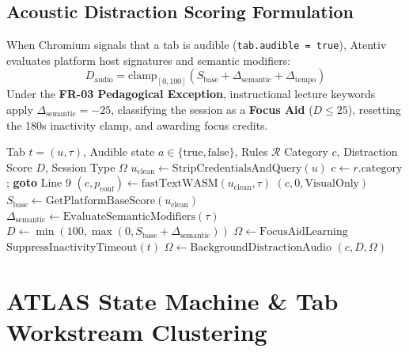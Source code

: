 \documentclass[conference]{IEEEtran}
\begin{document}
\subsection{Acoustic Distraction Scoring Formulation}
When Chromium signals that a tab is audible (\texttt{tab.audible = true}), Atentiv evaluates platform host signatures and semantic modifiers:
\begin{equation}
D_{\text{audio}} = \text{clamp}_{[0, 100]}\left( S_{\text{base}} + \Delta_{\text{semantic}} + \Delta_{\text{tempo}} \right)
\end{equation}
Under the \textbf{FR-03 Pedagogical Exception}, instructional lecture keywords apply $\Delta_{\text{semantic}} = -25$, classifying the session as a \textbf{Focus Aid} ($D \le 25$), resetting the 180s inactivity clamp, and awarding focus credits.

\begin{algorithm}[t]
\caption{Multimodal Contextual Inference Pipeline}
\begin{algorithmic}[1]
\REQUIRE Tab $t = (u, \tau)$, Audible state $a \in \{\text{true}, \text{false}\}$, Rules $\mathcal{R}$
\ENSURE Category $c$, Distraction Score $D$, Session Type $\Omega$
\STATE $u_{\text{clean}} \leftarrow \text{StripCredentialsAndQuery}(u)$
        \STATE $c \leftarrow r.\text{category}$; \textbf{goto} Line 9
    \ENDIF
\ENDFOR
\STATE $(c, p_{\text{conf}}) \leftarrow \text{fastTextWASM}(u_{\text{clean}}, \tau)$
    \RETURN $(c, 0, \text{VisualOnly})$
\ELSE
    \STATE $S_{\text{base}} \leftarrow \text{GetPlatformBaseScore}(u_{\text{clean}})$
    \STATE $\Delta_{\text{semantic}} \leftarrow \text{EvaluateSemanticModifiers}(\tau)$
    \STATE $D \leftarrow \min(100, \max(0, S_{\text{base}} + \Delta_{\text{semantic}}))$
        \STATE $\Omega \leftarrow \text{FocusAidLearning}$
        \STATE $\text{SuppressInactivityTimeout}(t)$
    \ELSE
        \STATE $\Omega \leftarrow \text{BackgroundDistractionAudio}$
    \ENDIF
    \RETURN $(c, D, \Omega)$
\ENDIF
\end{algorithmic}
\end{algorithm}

\section{ATLAS State Machine \& Tab Workstream Clustering}
\end{document}
